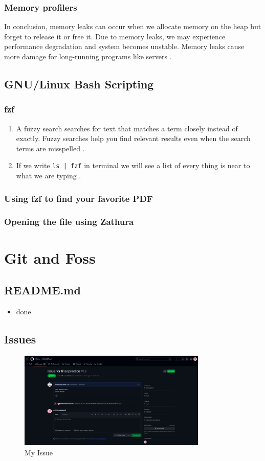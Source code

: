 \documentclass{article}
\begin{document}
\subsubsection{Memory profilers}
In conclusion, memory leaks can occur when we allocate memory on the heap but forget to release it or free it. Due to memory leaks, we may experience performance degradation and system becomes unstable. Memory leaks cause more damage for long-running programs like servers .
\newpage
\subsection{GNU/Linux Bash Scripting}
\subsubsection{fzf}
\begin{enumerate}
    \item{A fuzzy search searches for text that matches a term closely instead of exactly. Fuzzy searches help you find relevant results even when the search terms are misspelled .}
    \item{If we write \texttt{ls | fzf} in terminal we will see a list of every thing is near to what we are typing .}
\end{enumerate}
\subsubsection{Using fzf to find your favorite PDF}
\subsubsection{Opening the file using Zathura}
\section{Git and Foss}
\subsection{README.md}
\begin{itemize}
    \item{done}
\end{itemize}
\subsection{Issues}
\begin{figure}[h]
\centerline{\includegraphics[width = 0.8\textwidth]{issue.png}}
\caption{My Issue}
\label{fig}
\end{figure}
\end{document}
